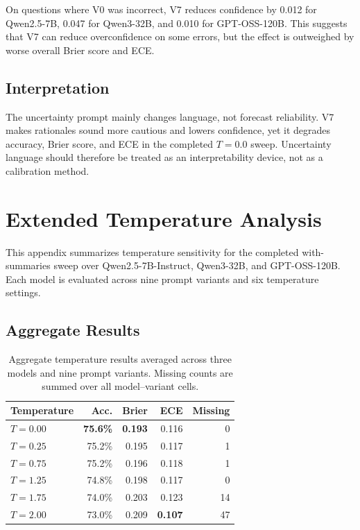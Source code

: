 \documentclass[11pt]{article}
\begin{document}
On questions where V0 was incorrect, V7 reduces confidence by 0.012 for Qwen2.5-7B, 0.047 for Qwen3-32B, and 0.010 for GPT-OSS-120B.
This suggests that V7 can reduce overconfidence on some errors, but the effect is outweighed by worse overall Brier score and ECE.

\subsection{Interpretation}

The uncertainty prompt mainly changes language, not forecast reliability.
V7 makes rationales sound more cautious and lowers confidence, yet it degrades accuracy, Brier score, and ECE in the completed $T=0.0$ sweep.
Uncertainty language should therefore be treated as an interpretability device, not as a calibration method.

\section{Extended Temperature Analysis}
\label{app:temperature}

This appendix summarizes temperature sensitivity for the completed with-summaries sweep over Qwen2.5-7B-Instruct, Qwen3-32B, and GPT-OSS-120B.
Each model is evaluated across nine prompt variants and six temperature settings.

\subsection{Aggregate Results}

\begin{table}[h]
\centering
\small
\begin{tabular}{lrrrr}
\toprule
\textbf{Temperature} & \textbf{Acc.} & \textbf{Brier} & \textbf{ECE} & \textbf{Missing} \\
\midrule
$T=0.00$ & \textbf{75.6\%} & \textbf{0.193} & 0.116 & 0 \\
$T=0.25$ & 75.2\% & 0.195 & 0.117 & 1 \\
$T=0.75$ & 75.2\% & 0.196 & 0.118 & 1 \\
$T=1.25$ & 74.8\% & 0.198 & 0.117 & 0 \\
$T=1.75$ & 74.0\% & 0.203 & 0.123 & 14 \\
$T=2.00$ & 73.0\% & 0.209 & \textbf{0.107} & 47 \\
\bottomrule
\end{tabular}
\caption{Aggregate temperature results averaged across three models and nine prompt variants. Missing counts are summed over all model--variant cells.}
\label{tab:temp-aggregate}
\end{table}
\end{document}
